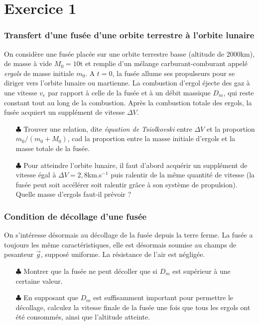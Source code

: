 \documentclass{report}
\begin{document}
\section*{Exercice 1}

\subsubsection*{Transfert d'une fusée d'une orbite terrestre à l'orbite lunaire}

On considère une fusée placée sur une orbite terrestre basse (altitude de 2000km), de masse à vide $M_0=10$t et remplie d'un mélange carburant-comburant appelé \textit{ergols} de masse initiale $m_0$. A $t=0$, la fusée allume ses propulseurs pour se diriger vers l'orbite lunaire ou martienne. La combustion d'ergol éjecte des gaz à une vitesse $v_e$ par rapport à celle de la fusée et à un débit massique $D_m$, qui reste constant tout au long de la combustion. Après la combustion totale des ergols, la fusée acquiert un supplément de vitesse $\Delta V$.

\begin{itemize}

	\item[$\clubsuit$] Trouver une relation, dite \textit{équation de Tsiolkovski} entre $\Delta V$ et la proportion $m_0/(m_0+M_0)$, cad la proportion entre la masse initiale d'ergols et la masse totale de la fusée. 
	
	\item[$\clubsuit$] Pour atteindre l'orbite lunaire, il faut d'abord acquérir un supplément de vitesse égal à $\Delta V=2,8$km.s$^{-1}$ puis ralentir de la même quantité de vitesse (la fusée peut soit accélérer soit ralentir grâce à son système de propulsion). Quelle masse d'ergols faut-il prévoir ?
	
\end{itemize}

\subsubsection*{Condition de décollage d'une fusée}

On s'intéresse désormais au décollage de la fusée depuis la terre ferme. La fusée a toujours les même caractéristiques, elle est désormais soumise au champs de pesanteur $\vec{g}$, supposé uniforme. La résistance de l'air est négligée. 

\begin{itemize}

\item[$\clubsuit$] Montrer que la fusée ne peut décoller que si $D_m$ est supérieur à une certaine valeur.
\item[$\clubsuit$] En supposant que $D_m$ est suffisamment important pour permettre le décollage, calculez la vitesse finale de la fusée une fois que tous les ergols ont été consommés, ainsi que l'altitude atteinte.

\end{itemize}
\end{document}
